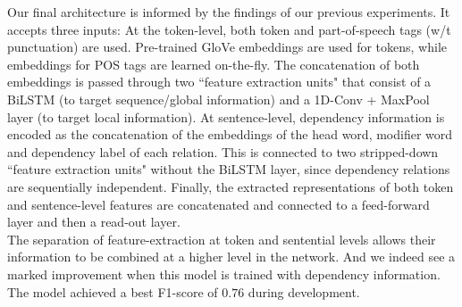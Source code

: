\documentclass[11pt]{article}
\begin{document}
Our final architecture is informed by the findings of our previous experiments. It accepts three inputs: At the token-level, both  token
and part-of-speech tags (w/t punctuation) are used. Pre-trained GloVe embeddings are used for tokens, while embeddings for POS tags
are learned on-the-fly. The concatenation of both embeddings is passed through two ``feature extraction units" that consist of a
BiLSTM (to target sequence/global information) and a 1D-Conv + MaxPool layer (to target local information). At sentence-level,
dependency information is encoded as the concatenation of the embeddings of the head word, modifier word and dependency label of each relation.
This is connected to two stripped-down ``feature extraction units" without the BiLSTM layer, since dependency relations are
sequentially independent. Finally, the extracted representations of both token and sentence-level features are concatenated and
connected to a feed-forward layer and then a read-out layer.\\

The separation of feature-extraction at token and sentential levels allows their information to be combined
at a higher level in the network. And we indeed see a marked improvement when this model is trained with dependency information.
The model achieved a best F1-score of $0.76$ during development.
\end{document}
